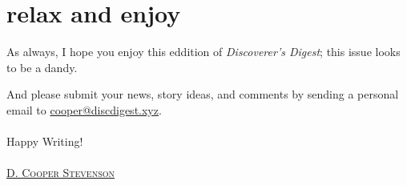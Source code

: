 \section{relax and enjoy}
As always, I hope you enjoy this eddition of \emph{Discoverer's Digest}; this
issue looks to be a dandy.

And please submit your news, story ideas, and comments by sending a personal email to \href{mailto:cooper@discdigest.xyz}{cooper@discdigest.xyz}. \\ \\

\noindent Happy Writing! \\ \\

\noindent \href{mailto:cooper@discdigest.xyz}{\textsc{D. Cooper Stevenson}}
